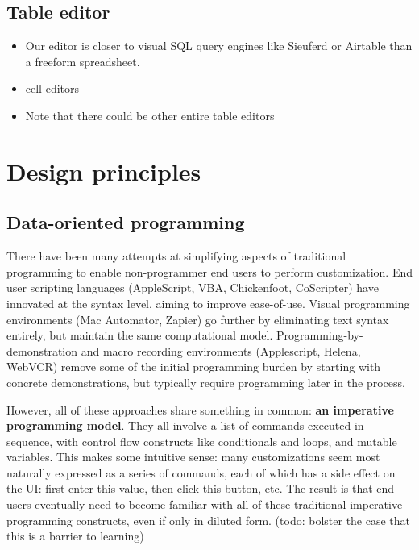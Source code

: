 \documentclass[sigplan,10pt,anonymous,review]{acmart}
\providecommand{\tightlist}{%
  \setlength{\itemsep}{0pt}\setlength{\parskip}{0pt}}
\begin{document}
\hypertarget{table-editor}{%
\subsection{Table editor}\label{table-editor}}

\begin{itemize}
\tightlist
\item
  Our editor is closer to visual SQL query engines like Sieuferd or
  Airtable than a freeform spreadsheet.
\item
  cell editors
\item
  Note that there could be other entire table editors
\end{itemize}

\hypertarget{sec:design-principles}{%
\section{Design principles}\label{sec:design-principles}}

\hypertarget{data-oriented-programming}{%
\subsection{Data-oriented programming}\label{data-oriented-programming}}

There have been many attempts at simplifying aspects of traditional
programming to enable non-programmer end users to perform customization.
End user scripting languages (AppleScript, VBA, Chickenfoot, CoScripter)
have innovated at the syntax level, aiming to improve ease-of-use.
Visual programming environments (Mac Automator, Zapier) go further by
eliminating text syntax entirely, but maintain the same computational
model. Programming-by-demonstration and macro recording environments
(Applescript, Helena, WebVCR) remove some of the initial programming
burden by starting with concrete demonstrations, but typically require
programming later in the process.

However, all of these approaches share something in common: \textbf{an
imperative programming model}. They all involve a list of commands
executed in sequence, with control flow constructs like conditionals and
loops, and mutable variables. This makes some intuitive sense: many
customizations seem most naturally expressed as a series of commands,
each of which has a side effect on the UI: first enter this value, then
click this button, etc. The result is that end users eventually need to
become familiar with all of these traditional imperative programming
constructs, even if only in diluted form. (todo: bolster the case that
this is a barrier to learning)
\end{document}
